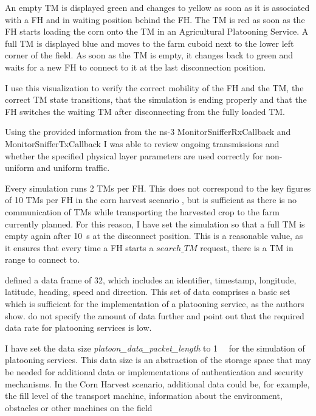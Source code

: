 An empty \ac{TM} is displayed green and changes to yellow as soon as it is associated with a \ac{FH} and in waiting position behind the \ac{FH}.
The \ac{TM} is red as soon as the \ac{FH} starts loading the corn onto the \ac{TM} in an Agricultural Platooning Service.
A full \ac{TM} is displayed blue and moves to the farm cuboid next to the lower left corner of the field.
As soon as the \ac{TM} is empty, it changes back to green and waits for a new \ac{FH} to connect to it at the last disconnection position.

I use this visualization to verify the correct mobility of the \ac{FH} and the \ac{TM}, the correct \ac{TM} state transitions,
that the simulation is ending properly and that the \ac{FH} switches the waiting \ac{TM} after disconnecting
from the fully loaded \ac{TM}.

Using the provided information from the ns-3 MonitorSnifferRxCallback and MonitorSnifferTxCallback I was able to review ongoing transmissions and
whether the specified physical layer parameters are used correctly for non-uniform and uniform traffic.

Every simulation runs \num{2} \ac{TM}s per \ac{FH}.
This does not correspond to the key figures of 10 \ac{TM}s per \ac{FH} in the corn harvest scenario \cite{faustzahlen2018},
but is sufficient as there is no communication of \ac{TM}s while transporting the harvested crop to the farm currently planned.
For this reason, I have set the simulation so that a full \ac{TM} is empty again after \SI{10}{\second} at the disconnect position.
This is a reasonable value, as it ensures that every time a \ac{FH} starts a $search\_TM$ request, there is a \ac{TM} in range to connect to.

\textcite{zhang_method_2009} defined a data frame of \SI{32}{\byte}, which includes an identifier, timestamp, longitude,
latitude, heading, speed and direction.
This set of data comprises a basic set which is sufficient for the implementation of a platooning service,
as the authors show.
\textcite{schlingmann_aef_2019} do not specify the amount of data further and point out that the required data rate
for platooning services is low.

I have set the data size \textit{platoon\_data\_packet\_length} to \SI{1}{\kilo\byte} for the simulation of platooning services.
This data size is an abstraction of the storage space that may be needed for additional data or implementations
of authentication and security mechanisms.
In the Corn Harvest scenario, additional data could be, for example, the fill level of the transport machine,
information about the environment, obstacles or other machines on the field

